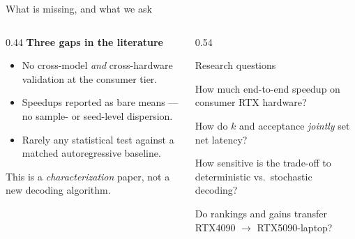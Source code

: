 \documentclass[aspectratio=169, 11pt]{beamer}
\begin{document}
\begin{frame}{What is missing, and what we ask}
  \begin{columns}[T,onlytextwidth]
    \begin{column}{0.44\textwidth}
      \textbf{Three gaps in the literature}
      \begin{itemize}\itemsep3pt
        \item No cross-model \emph{and} cross-hardware validation at the
              consumer tier.
        \item Speedups reported as bare means --- no sample- or seed-level
              dispersion.
        \item Rarely any statistical test against a matched autoregressive
              baseline.
      \end{itemize}
      \vspace{4pt}
      {\small This is a \emph{characterization} paper, not a new decoding
      algorithm.}
    \end{column}
    \begin{column}{0.54\textwidth}
      \begin{block}{Research questions}
        \small
        \begin{description}\itemsep2pt
          \item[RQ1] How much end-to-end speedup on consumer RTX hardware?
          \item[RQ2] How do $k$ and acceptance \emph{jointly} set net latency?
          \item[RQ3] How sensitive is the trade-off to deterministic
                vs.\ stochastic decoding?
          \item[RQ4] Do rankings and gains transfer RTX4090 $\to$
                RTX5090-laptop?
        \end{description}
      \end{block}
    \end{column}
  \end{columns}
\end{frame}
\end{document}
